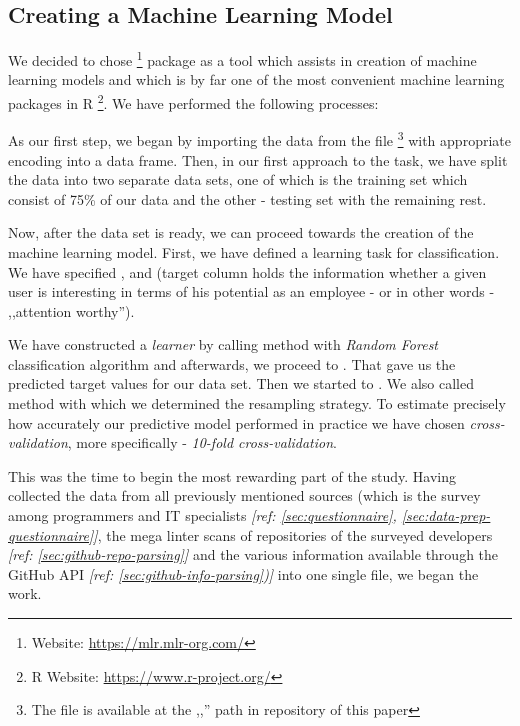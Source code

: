 \subsection{Creating a Machine Learning Model}
\label{sec:creating-machine-learning-model}

We decided to chose  \footnote{ Website: \url{https://mlr.mlr-org.com/}} package as a tool which assists in creation of machine learning models and which is by far one of the most convenient machine learning packages in R \footnote{R Website: \url{https://www.r-project.org/}}. We have performed the following processes:

As our first step, we began by importing the data from the  file \footnote{The  file is available at the ,,'' path in repository of this paper} with appropriate   encoding into a data frame.
Then, in our first approach to the task, we have split the data into two separate data sets, one of which is the training set which consist of 75\% of our data and the other - testing set with the remaining rest. 

Now, after the data set is ready, we can proceed towards the creation of the machine learning model. First, we have defined a learning task for classification. We have specified ,  and  (target column holds the information whether a given user is interesting in terms of his potential as an employee - or in other words - ,,attention worthy''). 

We have constructed a \emph{learner} by calling  method with \emph{Random Forest} classification algorithm and afterwards, we proceed to . That gave us the predicted target values for our data set. Then we started to . We also called  method with which we determined the resampling strategy. To estimate precisely how accurately our predictive model performed in practice we have chosen \emph{cross-validation}, more specifically - \emph{10-fold cross-validation}. 

This was the time to begin the most rewarding part of the study. Having collected the data from all previously mentioned sources (which is the survey among programmers and IT specialists \textit{[ref: \ref{sec:questionnaire}, \ref{sec:data-prep-questionnaire}]}, the mega linter scans of repositories of the surveyed developers \textit{[ref: \ref{sec:github-repo-parsing}]} and the various information available through the GitHub API \textit{[ref: \ref{sec:github-info-parsing})]} into one single  file, we began the work. 

